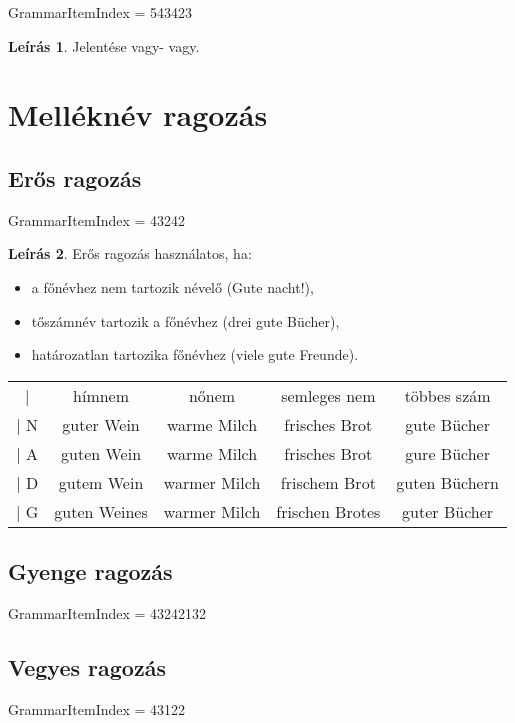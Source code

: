 \documentclass{article}
\theoremstyle{definition}
\newtheorem*{desc}{Leírás}
\begin{document}
GrammarItemIndex = 543423

\begin{desc}
Jelentése vagy- vagy.
\end{desc}

\section{Melléknév ragozás}

\subsection{Erős ragozás}

GrammarItemIndex = 43242

\begin{desc}
Erős ragozás használatos, ha:

\begin{itemize}
	\item a főnévhez nem tartozik névelő (Gute nacht!),
	\item tőszámnév tartozik a főnévhez (drei gute Bücher),
	\item határozatlan tartozika főnévhez (viele gute Freunde).
\end{itemize}

\begin{tabular}{ccccc}
 |  & hímnem & nőnem & semleges nem & többes szám\\
 | N & guter Wein & warme Milch & frisches Brot & gute Bücher\\
 | A & guten Wein & warme Milch & frisches Brot & gure Bücher\\
 | D & gutem Wein & warmer Milch & frischem Brot & guten Büchern\\
 | G & guten Weines & warmer Milch & frischen Brotes & guter Bücher\\
\end{tabular}
\end{desc}

\subsection{Gyenge ragozás}

GrammarItemIndex = 43242132

\subsection{Vegyes ragozás}

GrammarItemIndex = 43122
\end{document}
